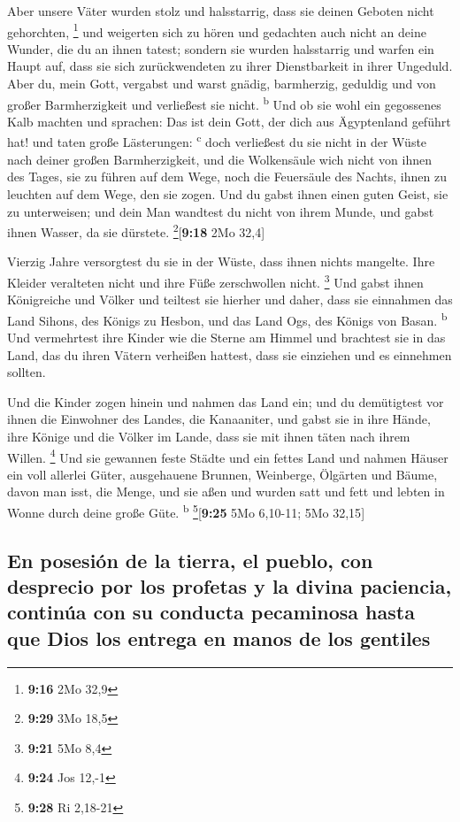  Aber unsere Väter wurden stolz und halsstarrig, dass sie
deinen Geboten nicht gehorchten, \footnote{\textbf{9:16} 2Mo 32,9}
 und weigerten sich zu hören und gedachten auch nicht an
deine Wunder, die du an ihnen tatest; sondern sie wurden halsstarrig und
warfen ein Haupt auf, dass sie sich zurückwendeten zu ihrer
Dienstbarkeit in ihrer Ungeduld. Aber du, mein Gott, vergabst und warst
gnädig, barmherzig, geduldig und von großer Barmherzigkeit und
verließest sie nicht. \textsuperscript{b}  Und ob sie
wohl ein gegossenes Kalb machten und sprachen: Das ist dein Gott, der
dich aus Ägyptenland geführt hat! und taten große Lästerungen:
\textsuperscript{c}  doch verließest du sie nicht in der
Wüste nach deiner großen Barmherzigkeit, und die Wolkensäule wich nicht
von ihnen des Tages, sie zu führen auf dem Wege, noch die Feuersäule des
Nachts, ihnen zu leuchten auf dem Wege, den sie zogen. 
Und du gabst ihnen einen guten Geist, sie zu unterweisen; und dein Man
wandtest du nicht von ihrem Munde, und gabst ihnen Wasser, da sie
dürstete. \footnote{\textbf{9:29} 3Mo 18,5}{[}\textbf{9:18} 2Mo 32,4{]}

 Vierzig Jahre versorgtest du sie in der Wüste, dass
ihnen nichts mangelte. Ihre Kleider veralteten nicht und ihre Füße
zerschwollen nicht. \footnote{\textbf{9:21} 5Mo 8,4}  Und
gabst ihnen Königreiche und Völker und teiltest sie hierher und daher,
dass sie einnahmen das Land Sihons, des Königs zu Hesbon, und das Land
Ogs, des Königs von Basan. \textsuperscript{b}  Und
vermehrtest ihre Kinder wie die Sterne am Himmel und brachtest sie in
das Land, das du ihren Vätern verheißen hattest, dass sie einziehen und
es einnehmen sollten.

 Und die Kinder zogen hinein und nahmen das Land ein; und
du demütigtest vor ihnen die Einwohner des Landes, die Kanaaniter, und
gabst sie in ihre Hände, ihre Könige und die Völker im Lande, dass sie
mit ihnen täten nach ihrem Willen. \footnote{\textbf{9:24} Jos 12,-1}
 Und sie gewannen feste Städte und ein fettes Land und
nahmen Häuser ein voll allerlei Güter, ausgehauene Brunnen, Weinberge,
Ölgärten und Bäume, davon man isst, die Menge, und sie aßen und wurden
satt und fett und lebten in Wonne durch deine große Güte.
\textsuperscript{b} \footnote{\textbf{9:28} Ri 2,18-21}{[}\textbf{9:25}
5Mo 6,10-11; 5Mo 32,15{]}

\hypertarget{en-posesiuxf3n-de-la-tierra-el-pueblo-con-desprecio-por-los-profetas-y-la-divina-paciencia-continuxfaa-con-su-conducta-pecaminosa-hasta-que-dios-los-entrega-en-manos-de-los-gentiles}{%
\subsection{En posesión de la tierra, el pueblo, con desprecio por los
profetas y la divina paciencia, continúa con su conducta pecaminosa
hasta que Dios los entrega en manos de los
gentiles}\label{en-posesiuxf3n-de-la-tierra-el-pueblo-con-desprecio-por-los-profetas-y-la-divina-paciencia-continuxfaa-con-su-conducta-pecaminosa-hasta-que-dios-los-entrega-en-manos-de-los-gentiles}}

